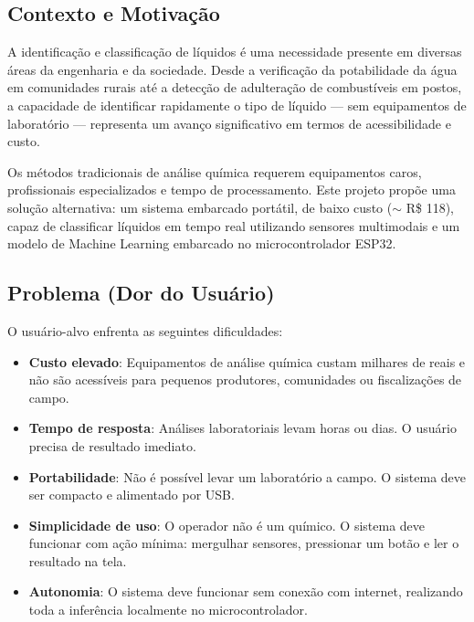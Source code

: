 \documentclass[12pt, a4paper]{article}
\begin{document}
\subsection{Contexto e Motiva\c{c}\~{a}o}

A identifica\c{c}\~{a}o e classifica\c{c}\~{a}o de l\'{i}quidos \'{e} uma necessidade presente em diversas \'{a}reas da engenharia e da sociedade. Desde a verifica\c{c}\~{a}o da potabilidade da \'{a}gua em comunidades rurais at\'{e} a detec\c{c}\~{a}o de adultera\c{c}\~{a}o de combust\'{i}veis em postos, a capacidade de identificar rapidamente o tipo de l\'{i}quido --- sem equipamentos de laborat\'{o}rio --- representa um avan\c{c}o significativo em termos de acessibilidade e custo.

Os m\'{e}todos tradicionais de an\'{a}lise qu\'{i}mica requerem equipamentos caros, profissionais especializados e tempo de processamento. Este projeto prop\~{o}e uma solu\c{c}\~{a}o alternativa: um sistema embarcado port\'{a}til, de baixo custo ($\sim$ R\$ 118), capaz de classificar l\'{i}quidos em tempo real utilizando sensores multimodais e um modelo de Machine Learning embarcado no microcontrolador ESP32.

\subsection{Problema (Dor do Usu\'{a}rio)}

O usu\'{a}rio-alvo enfrenta as seguintes dificuldades:

\begin{itemize}
  \item \textbf{Custo elevado}: Equipamentos de an\'{a}lise qu\'{i}mica custam milhares de reais e n\~{a}o s\~{a}o acess\'{i}veis para pequenos produtores, comunidades ou fiscaliza\c{c}\~{o}es de campo.
  \item \textbf{Tempo de resposta}: An\'{a}lises laboratoriais levam horas ou dias. O usu\'{a}rio precisa de resultado imediato.
  \item \textbf{Portabilidade}: N\~{a}o \'{e} poss\'{i}vel levar um laborat\'{o}rio a campo. O sistema deve ser compacto e alimentado por USB.
  \item \textbf{Simplicidade de uso}: O operador n\~{a}o \'{e} um qu\'{i}mico. O sistema deve funcionar com a\c{c}\~{a}o m\'{i}nima: mergulhar sensores, pressionar um bot\~{a}o e ler o resultado na tela.
  \item \textbf{Autonomia}: O sistema deve funcionar sem conex\~{a}o com internet, realizando toda a infer\^{e}ncia localmente no microcontrolador.
\end{itemize}
\end{document}
